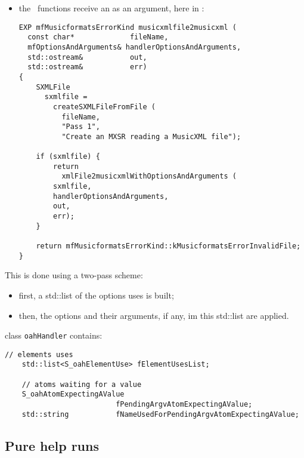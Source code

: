 {\begin{itemize}
\begin{lstlisting}[language=CPlusPlus]
  // create the global run data
  // ------------------------------------------------------

  gGlobalServiceRunData =
    mfServiceRunData::create (serviceName);

  // ... ... ...
}
\end{lstlisting}

\item the \API\ functions receive an  as an argument, here in :
\begin{lstlisting}[language=CPlusPlus]
EXP mfMusicformatsErrorKind musicxmlfile2musicxml (
  const char*             fileName,
  mfOptionsAndArguments& handlerOptionsAndArguments,
  std::ostream&           out,
  std::ostream&           err)
{
	SXMLFile
	  sxmlfile =
	    createSXMLFileFromFile (
	      fileName,
	      "Pass 1",
	      "Create an MXSR reading a MusicXML file");

	if (sxmlfile) {
		return
		  xmlFile2musicxmlWithOptionsAndArguments (
        sxmlfile,
        handlerOptionsAndArguments,
        out,
        err);
	}

	return mfMusicformatsErrorKind::kMusicformatsErrorInvalidFile;
}
\end{lstlisting}

\end{itemize}

This is done using a two-pass scheme:
\begin{itemize}
\item first, a std::list of the options uses is built;
\item then, the options and their arguments, if any, im this std::list are applied.
\end{itemize}

class   {\tt oahHandler} contains:
\begin{lstlisting}[language=CPlusPlus]
    // elements uses
    std::list<S_oahElementUse> fElementUsesList;

    // atoms waiting for a value
    S_oahAtomExpectingAValue
                          fPendingArgvAtomExpectingAValue;
    std::string           fNameUsedForPendingArgvAtomExpectingAValue;
\end{lstlisting}


	\subsection{Pure help runs}

}
